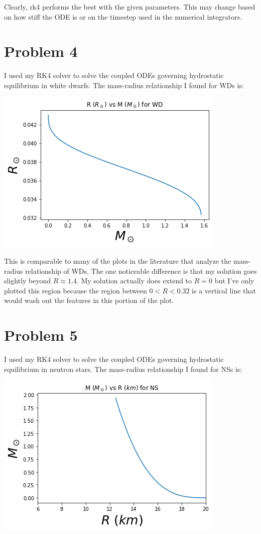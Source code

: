 \documentclass[12pt, letterpaper]{article}
\begin{document}
Clearly, rk4 performs the best with the given parameters. This may change based on how stiff the ODE is or on the timestep used in the numerical integrators.

\newpage

\section*{Problem 4}
I used my RK4 solver to solve the coupled ODEs governing hydrostatic equilibrium in white dwarfs. The mass-radius relationship I found for WDs is:

\includegraphics{WD_R_vs_M.png}

This is comparable to many of the plots in the literature that analyze the mass-radius relationship of WDs. The one noticeable difference is that my solution goes slightly beyond $ R \approx 1.4$. My solution actually does extend to $R = 0$ but I've only plotted this region because the region between $0 < R < 0.32$ is a vertical line that would wash out the features in this portion of the plot.

\section*{Problem 5}
I used my RK4 solver to solve the coupled ODEs governing hydrostatic equilibrium in neutron stars. The mass-radius relationship I found for NSs
is:

\includegraphics{NS_M_vs_R.png}
\end{document}
